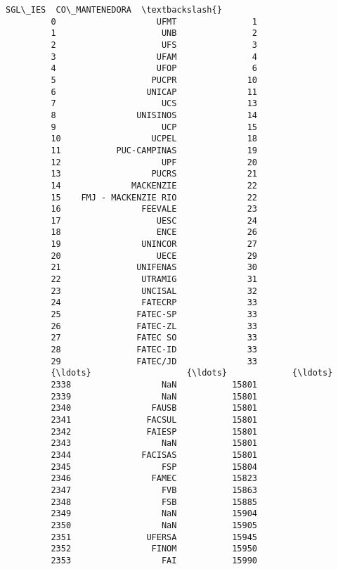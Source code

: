\documentclass[11pt]{article}
\begin{document}
\begin{Verbatim}[commandchars=\\\{\}]
                           SGL\_IES  CO\_MANTENEDORA  \textbackslash{}
         0                    UFMT               1   
         1                     UNB               2   
         2                     UFS               3   
         3                    UFAM               4   
         4                    UFOP               6   
         5                   PUCPR              10   
         6                  UNICAP              11   
         7                     UCS              13   
         8                UNISINOS              14   
         9                     UCP              15   
         10                  UCPEL              18   
         11           PUC-CAMPINAS              19   
         12                    UPF              20   
         13                  PUCRS              21   
         14              MACKENZIE              22   
         15    FMJ - MACKENZIE RIO              22   
         16                FEEVALE              23   
         17                   UESC              24   
         18                   ENCE              26   
         19                UNINCOR              27   
         20                   UECE              29   
         21               UNIFENAS              30   
         22                UTRAMIG              31   
         23                UNCISAL              32   
         24                FATECRP              33   
         25               FATEC-SP              33   
         26               FATEC-ZL              33   
         27               FATEC SO              33   
         28               FATEC-ID              33   
         29               FATEC/JD              33   
         {\ldots}                   {\ldots}             {\ldots}   
         2338                  NaN           15801   
         2339                  NaN           15801   
         2340                FAUSB           15801   
         2341               FACSUL           15801   
         2342               FAIESP           15801   
         2343                  NaN           15801   
         2344              FACISAS           15801   
         2345                  FSP           15804   
         2346                FAMEC           15823   
         2347                  FVB           15863   
         2348                  FSB           15885   
         2349                  NaN           15904   
         2350                  NaN           15905   
         2351               UFERSA           15945   
         2352                FINOM           15950   
         2353                  FAI           15990   

\end{Verbatim}
\end{document}
